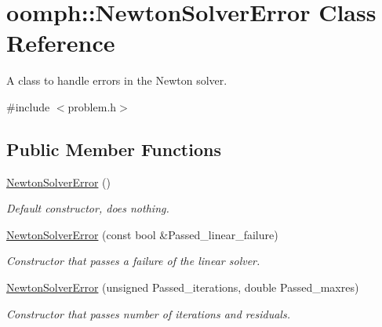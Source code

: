 \hypertarget{classoomph_1_1NewtonSolverError}{}\section{oomph\+:\+:Newton\+Solver\+Error Class Reference}
\label{classoomph_1_1NewtonSolverError}


A class to handle errors in the Newton solver.  




{\ttfamily \#include $<$problem.\+h$>$}

\subsection*{Public Member Functions}
\begin{DoxyCompactItemize}
\item 
\hyperlink{classoomph_1_1NewtonSolverError_a9bff481c8bed13d3f3de7f1d50c4d561}{Newton\+Solver\+Error} ()
\begin{DoxyCompactList}\small\item\em Default constructor, does nothing. \end{DoxyCompactList}\item 
\hyperlink{classoomph_1_1NewtonSolverError_ae58d468c558b69a3b0a02b8287c7d242}{Newton\+Solver\+Error} (const bool \&Passed\+\_\+linear\+\_\+failure)
\begin{DoxyCompactList}\small\item\em Constructor that passes a failure of the linear solver. \end{DoxyCompactList}\item 
\hyperlink{classoomph_1_1NewtonSolverError_a13723668ce6a21c38dcd612ee580716b}{Newton\+Solver\+Error} (unsigned Passed\+\_\+iterations, double Passed\+\_\+maxres)
\begin{DoxyCompactList}\small\item\em Constructor that passes number of iterations and residuals. \end{DoxyCompactList}\end{DoxyCompactItemize}

